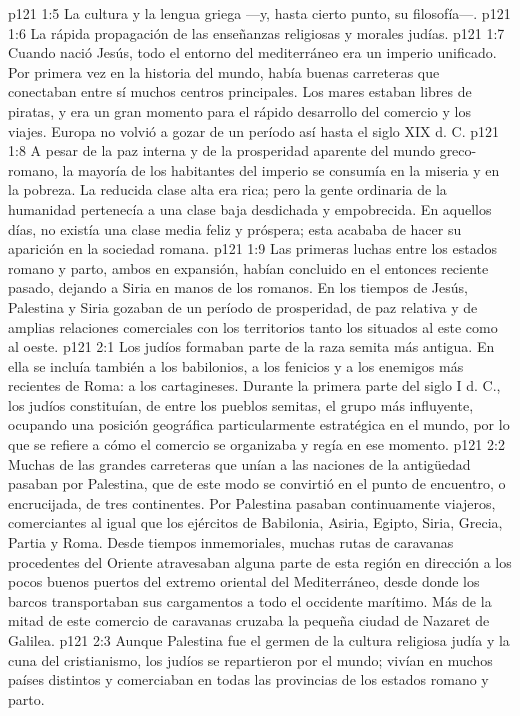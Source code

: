 \vs p121 1:5 La cultura y la lengua griega ---y, hasta cierto punto, su filosofía---.
\vs p121 1:6 La rápida propagación de las enseñanzas religiosas y morales judías.
\vs p121 1:7 \pc Cuando nació Jesús, todo el entorno del mediterráneo era un imperio unificado. Por primera vez en la historia del mundo, había buenas carreteras que conectaban entre sí muchos centros principales. Los mares estaban libres de piratas, y era un gran momento para el rápido desarrollo del comercio y los viajes. Europa no volvió a gozar de un período así hasta el siglo XIX d. C.
\vs p121 1:8 A pesar de la paz interna y de la prosperidad aparente del mundo greco\hyp{}romano, la mayoría de los habitantes del imperio se consumía en la miseria y en la pobreza. La reducida clase alta era rica; pero la gente ordinaria de la humanidad pertenecía a una clase baja desdichada y empobrecida. En aquellos días, no existía una clase media feliz y próspera; esta acababa de hacer su aparición en la sociedad romana.
\vs p121 1:9 Las primeras luchas entre los estados romano y parto, ambos en expansión, habían concluido en el entonces reciente pasado, dejando a Siria en manos de los romanos. En los tiempos de Jesús, Palestina y Siria gozaban de un período de prosperidad, de paz relativa y de amplias relaciones comerciales con los territorios tanto los situados al este como al oeste.
\vs p121 2:1 Los judíos formaban parte de la raza semita más antigua. En ella se incluía también a los babilonios, a los fenicios y a los enemigos más recientes de Roma: a los cartagineses. Durante la primera parte del siglo I d. C., los judíos constituían, de entre los pueblos semitas, el grupo más influyente, ocupando una posición geográfica particularmente estratégica en el mundo, por lo que se refiere a cómo el comercio se organizaba y regía en ese momento.
\vs p121 2:2 Muchas de las grandes carreteras que unían a las naciones de la antigüedad pasaban por Palestina, que de este modo se convirtió en el punto de encuentro, o encrucijada, de tres continentes. Por Palestina pasaban continuamente viajeros, comerciantes al igual que los ejércitos de Babilonia, Asiria, Egipto, Siria, Grecia, Partia y Roma. Desde tiempos inmemoriales, muchas rutas de caravanas procedentes del Oriente atravesaban alguna parte de esta región en dirección a los pocos buenos puertos del extremo oriental del Mediterráneo, desde donde los barcos transportaban sus cargamentos a todo el occidente marítimo. Más de la mitad de este comercio de caravanas cruzaba la pequeña ciudad de Nazaret de Galilea.
\vs p121 2:3 Aunque Palestina fue el germen de la cultura religiosa judía y la cuna del cristianismo, los judíos se repartieron por el mundo; vivían en muchos países distintos y comerciaban en todas las provincias de los estados romano y parto.
